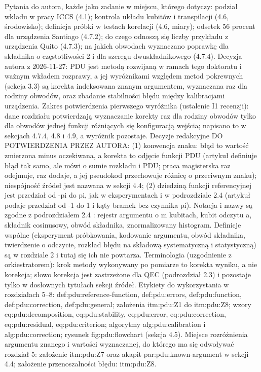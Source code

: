 {Pytania do autora, każde jako zadanie w miejscu, którego dotyczy: podział wkładu w pracy ICCS (4.1); kontrola układu kubitów i transpilacji (4.6, środowisko); definicja próbki w testach korelacji (4.6, miary); odsetek 56 procent dla urządzenia Santiago (4.7.2); do czego odnoszą się liczby przykładu z urządzenia Quito (4.7.3); na jakich obwodach wyznaczano poprawkę dla składnika o częstotliwości 2 i dla szeregu dwuskładnikowego (4.7.4).
Decyzja autora z 2026-11-27: PDU jest metodą rozwijaną w ramach tego doktoratu i ważnym wkładem rozprawy, a jej wyróżnikami względem metod pokrewnych (sekcja 3.3) są korekta indeksowana znanym argumentem, wyznaczana raz dla rodziny obwodów, oraz zbadanie stabilności błędu między kalibracjami urządzenia.
Zakres potwierdzenia pierwszego wyróżnika (ustalenie I1 recenzji): dane rozdziału potwierdzają wyznaczanie korekty raz dla rodziny obwodów tylko dla obwodów jednej funkcji różniących się konfiguracją wejścia; napisano to w sekcjach 4.7.4, 4.8 i 4.9, a wyróżnik pozostaje.
Decyzje redakcyjne DO POTWIERDZENIA PRZEZ AUTORA:
(1) konwencja znaku: błąd to wartość zmierzona minus oczekiwana, a korekta to odjęcie funkcji PDU (artykuł definiuje błąd tak samo, ale mówi o sumie rozkładu i PDU; praca magisterska raz odejmuje, raz dodaje, a jej pseudokod przechowuje różnicę o przeciwnym znaku); niespójność źródeł jest nazwana w sekcji 4.4;
(2) dziedziną funkcji referencyjnej jest przedział od -pi do pi, jak w eksperymentach i w podrozdziale 2.4 (artykuł podaje przedział od -1 do 1 i kąty bramek bez czynnika pi).
Notacja i nazwy są zgodne z podrozdziałem 2.4 : rejestr argumentu o m kubitach, kubit odczytu a, składnik cosinusowy, obwód składnika, znormalizowany histogram.
Definicje wspólne (eksperyment próbkowania, kodowanie argumentu, obwód składnika, twierdzenie o odczycie, rozkład błędu na składową systematyczną i statystyczną) są w rozdziale 2 i tutaj się ich nie powtarza.
Terminologia (uzgodnienie z orkiestratorem): krok metody wykonywany po pomiarze to korekta wyniku, a nie korekcja; słowo korekcja jest zastrzeżone dla QEC (podrozdział 2.3) i pozostaje tylko w dosłownych tytułach sekcji źródeł.
Etykiety do wykorzystania w rozdziałach 5--8: def:pdu:reference-function, def:pdu:errors, def:pdu:function, def:pdu:correction, def:pdu:general; założenia itm:pdu:Z1 do itm:pdu:Z8; wzory eq:pdu:decomposition, eq:pdu:stability, eq:pdu:error, eq:pdu:correction, eq:pdu:residual, eq:pdu:criterion; algorytmy alg:pdu:calibration i alg:pdu:correction; rysunek fig:pdu:flowchart (sekcja 4.5).
Miejsce rozróżnienia argumentu znanego i wartości wyznaczanej, do którego ma się odwoływać rozdział 5: założenie itm:pdu:Z7 oraz akapit par:pdu:known-argument w sekcji 4.4; założenie przenoszalności błędu: itm:pdu:Z8.
}

